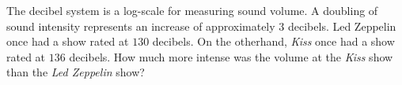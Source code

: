 \documentclass[nooutcomes,noauthor]{ximera}
\begin{document}
\begin{exercise}
    The decibel system is a log-scale for measuring sound volume. 
    A doubling of sound intensity represents an increase of approximately
$3$ decibels. Led Zeppelin once had a show rated at $130$ decibels. On the otherhand, \textit{Kiss} 
once had a show rated at $136$ decibels. How much more intense was the volume at the \textit{Kiss} show than the
\textit{Led Zeppelin} show? 
\end{exercise}

\end{document}
